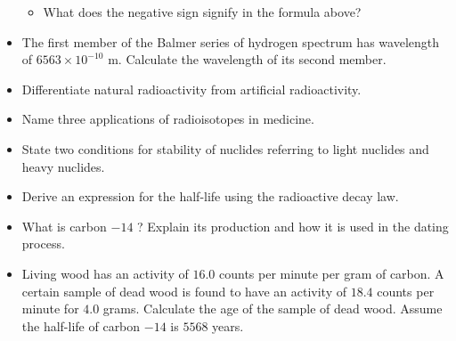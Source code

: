 \documentclass{article}
\begin{document}
\begin{itemize}
 \begin{itemize}
\item What does the negative sign signify in the formula above?
\end{itemize}
\item The first member of the Balmer series of hydrogen spectrum has wavelength of $ 6563 \times 10^{-10}$ m. Calculate the wavelength of its second member.
\item Differentiate natural radioactivity from artificial radioactivity.
\item Name three applications of radioisotopes in medicine.
\item State two conditions for stability of nuclides referring to light nuclides and heavy nuclides.
\item Derive an expression for the half-life using the radioactive decay law.
\item What is carbon $ -14$ ?  Explain its production and how it is used in the dating process.
\item Living wood has an activity of $ 16.0$ counts per minute per gram of carbon.  A certain sample of dead wood is found to have an activity of $ 18.4$ counts per minute for $ 4.0$ grams.  Calculate the age of the sample of dead wood.  Assume the half-life of carbon $ -14$ is $ 5568$ years.
\end{itemize}
\end{document}
